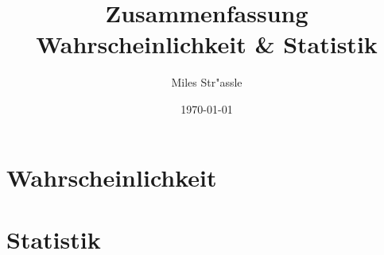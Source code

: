 \documentclass[11pt]{article}
\begin{document}
\author{Miles Str"assle}
\title{Zusammenfassung Wahrscheinlichkeit \& Statistik}
\date{\today}
\maketitle

\setcounter{tocdepth}{2}





\setcounter{part}{23} %
\part*{Wahrscheinlichkeit}








\setcounter{part}{19} %
\part*{Statistik}
\setcounter{section}{0}

%









%



\end{document}
